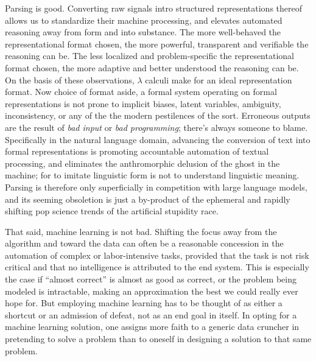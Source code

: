 Parsing is good.
Converting raw signals intro structured representations thereof allows us to standardize their machine processing, and elevates automated reasoning away from form and into substance.
The more well-behaved the representational format chosen, the more powerful, transparent and verifiable the reasoning can be.
The less localized and problem-specific the representational format chosen, the more adaptive and better understood the reasoning can be.
On the basis of these observations, $\lambda$ calculi make for an ideal representation format.
Now choice of format aside, a formal system operating on formal representations is not prone to implicit biases, latent variables, ambiguity, inconsistency, or any of the the modern pestilences of the sort.
Erroneous outputs are the result of \textit{bad input} or \textit{bad programming}; there's always someone to blame.
Specifically in the natural language domain, advancing the conversion of text into formal representations is promoting accountable automation of textual processing, and eliminates the anthromorphic delusion of the ghost in the machine; for to imitate linguistic form is not to understand linguistic meaning.
Parsing is therefore only superficially in competition with large language models, and its seeming obsoletion is just a by-product of the ephemeral and rapidly shifting pop science trends of the artificial stupidity race.

That said, machine learning is not bad.
Shifting the focus away from the algorithm and toward the data can often be a reasonable concession in the automation of complex or labor-intensive tasks, provided that the task is not risk critical and that no intelligence is attributed to the end system.
This is especially the case if ``almost correct'' is almost as good as correct, or the problem being modeled is intractable, making an approximation the best we could really ever hope for.
But employing machine learning has to be thought of as either a shortcut or an admission of defeat, not as an end goal in itself.
In opting for a machine learning solution, one assigns more faith to a generic data cruncher in pretending to solve a problem than to oneself in designing a solution to that same problem.

